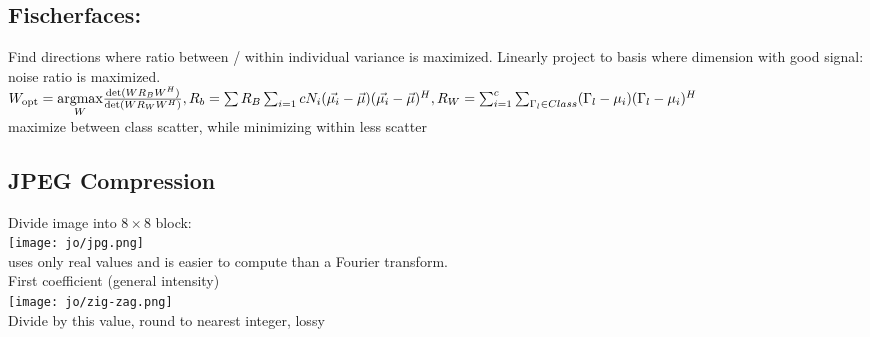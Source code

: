 \subsection{Fischerfaces:} 
Find directions where ratio between / within individual variance is maximized. Linearly project to basis where dimension with good signal: noise ratio is maximized. \\
$W_{\text{opt}} = \underset{W}{\text{argmax}} \frac{\det(W R_B W^H)}{\det(W R_W W^H)}, R_b = \sum R_B \sum_{i = 1}{c} N_i (\vec{\mu_i} - \vec{\mu})(\vec{\mu_i} - \vec{\mu})^H, R_W = \sum_{i = 1}^{c} \sum_{\Gamma_l \in Class} (\Gamma_l - \mu_i)(\Gamma_l - \mu_i)^H$\\
 maximize between class scatter, while minimizing within less scatter
\subsection*{JPEG Compression}
Divide image into $8 \times 8$ block:\\
\texttt{[image: jo/jpg.png]}\\
 uses only real values and is easier to compute than a Fourier transform.\\
 First coefficient (general intensity)\\
 \texttt{[image: jo/zig-zag.png]}\\
 Divide by this value, round to nearest integer, lossy